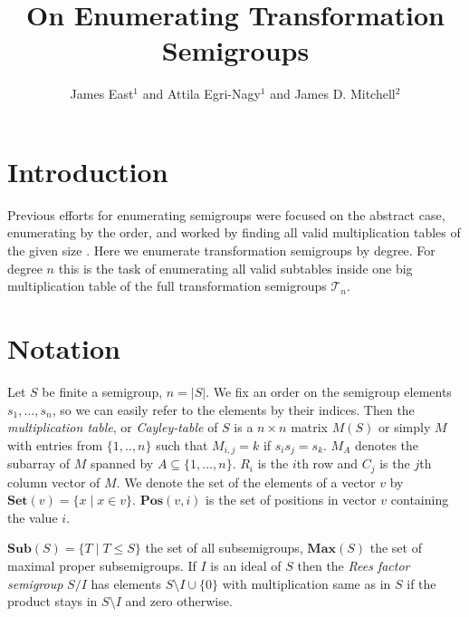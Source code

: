 \documentclass{amsart}
\newcommand{\cT}{{\mathcal T}}
\newcommand{\Sub}{\mathbf{Sub}}
\newcommand{\Set}{\mathbf{Set}}
\newcommand{\Pos}{\mathbf{Pos}}
\newcommand{\Max}{\mathbf{Max}}
\theoremstyle{plain}
\theoremstyle{definition}
\begin{document}
\title{On Enumerating Transformation Semigroups}
\author{James East$^1$ and Attila Egri-Nagy$^{1}$ and James D. Mitchell$^2$}
\address{$^1$Centre for Research in Mathematics, School of Computing, Engineering and Mathematics, University of Western Sydney (Parramatta Campus), Locked Bag 1797, Penrith, NSW 2751, Australia}
\address{$^2$ Mathematical Institute, University of St Andrews, North Haugh, St Andrews, Fife, KY16 9SS, Scotland}

\maketitle

\tableofcontents
\section{Introduction}
Previous efforts for enumerating semigroups were focused on the abstract case, enumerating by the order, and worked by finding all valid multiplication tables of the given size \cite{monoidenum2009}.
Here we enumerate transformation semigroups by degree.
For degree $n$ this is the task of enumerating all valid subtables inside one big multiplication table of the  full transformation semigroups $\cT_n$.

\section{Notation}
Let $S$ be finite a semigroup, $n=|S|$.
We fix an order on the semigroup elements $s_1,\ldots, s_n$, so we can easily refer to the elements by their indices. 
Then the  \emph{multiplication table}, or \emph{Cayley-table} of $S$ is a $n\times n$ matrix $M(S)$ or simply $M$ with entries from $\{1,..,n\}$ such that $M_{i,j}=k$ if $s_is_j=s_k$.
$M_A$ denotes the subarray of $M$ spanned by $A\subseteq\{1,\ldots,n\}$.
$R_i$ is the $i$th row and $C_j$ is the $j$th column vector of $M$.
We denote the set of the elements of a vector $v$ by $\Set(v)=\{x\mid x\in v\}$.
$\Pos(v,i)$ is the set of positions in vector $v$ containing the value $i$.

$\Sub(S)=\big\{T\mid T\leq S \big\}$ the set of all subsemigroups, $\Max(S)$ the set of maximal proper subsemigroups.
If $I$ is an ideal of $S$ then the \emph{Rees factor semigroup} $S/I$ has elements $S\setminus I\cup\{0\}$ with multiplication same as in $S$ if the product stays in $S\setminus I$ and zero otherwise.
\end{document}
